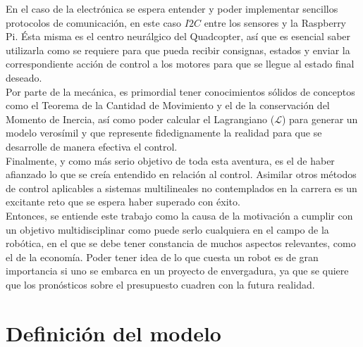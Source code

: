 \documentclass[twoside]{article}
\begin{document}
En el caso de la electrónica se espera entender y poder implementar sencillos protocolos de comunicación, en este caso $I2C$ entre los sensores y la Raspberry Pi. Ésta misma es el centro neurálgico del Quadcopter, así que es esencial saber utilizarla como se requiere para que pueda recibir consignas, estados y enviar la correspondiente acción de control a los motores para que se llegue al estado final deseado. \\

Por parte de la mecánica, es primordial tener conocimientos sólidos de conceptos como el Teorema de la Cantidad de Movimiento y el de la conservación del Momento de Inercia, así como poder calcular el Lagrangiano ($\mathcal{L}$) para generar un modelo verosímil y que represente fidedignamente la realidad para que se desarrolle de manera efectiva el control. \\

Finalmente, y como más serio objetivo de toda esta aventura, es el de haber afianzado lo que se creía entendido en relación al control. Asimilar otros métodos de control aplicables a sistemas multilineales no contemplados en la carrera es un excitante reto que se espera haber superado con éxito. \\

Entonces, se entiende este trabajo como la causa de la motivación a cumplir con un objetivo multidisciplinar como puede serlo cualquiera en el campo de la robótica, en el que se debe tener constancia de muchos aspectos relevantes, como el de la economía. Poder tener idea de lo que cuesta un robot es de gran importancia si uno se embarca en un proyecto de envergadura, ya que se quiere que los pronósticos sobre el presupuesto cuadren con la futura realidad. 

\newpage
\section{Definición del modelo} \label{def}
\end{document}
